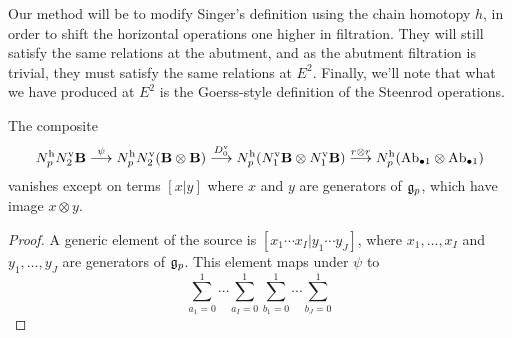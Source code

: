 \documentclass[10pt]{article}
\begin{document}
\begin{Lie Steenrods satisfy the Adem relation}
Our method will be to modify Singer's definition using the chain homotopy $h$, in order to shift the horizontal operations one higher in filtration. They will still satisfy the same relations at the abutment, and as the abutment filtration is trivial, they must satisfy the same relations at $E^2$. Finally, we'll note that what we have produced at $E^2$ is the Goerss-style definition of the Steenrod operations.
%
\begin{lem}\label{firstCompositeLemma}
The composite
\[N_{p}^\textup{h}N_2^\textup{v}\textbf{B}\overset{\psi}{\to} N_{p}^\textup{h}N_2^\textup{v}(\textbf{B}\otimes\textbf{B})\overset{D_0^\textup{v}}{\to} N_{p}^\textup{h}(N_1^\textup{v}\textbf{B}\otimes N_1^\textup{v}\textbf{B})\overset{r\otimes r}{\to}N^\textup{h}_p(\textup{Ab}_{\bullet 1}\otimes \textup{Ab}_{\bullet 1})\]
vanishes except on terms $[x|y]$ where $x$ and $y$ are generators of $\frakg_p$, which have image $x\otimes y$.
\end{lem}
\begin{proof}
A generic element of the source is $[x_1\cdots x_I|y_1\cdots y_J]$, where $x_1,\ldots,x_I$ and $y_1,\ldots,y_J$ are generators of $\frakg_p$. This element maps under $\psi$ to
\[\sum_{a_1=0}^1\cdots \sum_{a_I=0}^1
\sum_{b_1=0}^1\cdots \sum_{b_J=0}^1
\]
\end{proof}
\end{Lie Steenrods satisfy the Adem relation}
\end{document}
